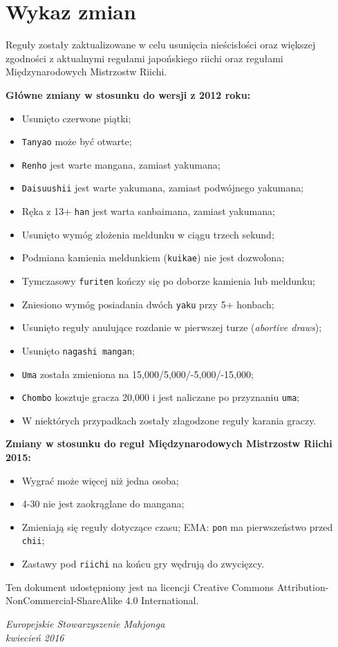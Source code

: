 \section*{Wykaz zmian}

Reguły zostały zaktualizowane w celu usunięcia nieścisłości oraz większej zgodności z aktualnymi regułami japońskiego riichi oraz regułami Międzynarodowych Mistrzostw Riichi.

\textbf{Główne zmiany w stosunku do wersji z 2012 roku:}
\begin{itemize}
    \item Usunięto czerwone piątki;
    \item \texttt{Tanyao} może być otwarte;
    \item \texttt{Renho} jest warte mangana, zamiast yakumana;
    \item \texttt{Daisuushii} jest warte yakumana, zamiast podwójnego yakumana;
    \item Ręka z 13+ \texttt{han} jest warta sanbaimana, zamiast yakumana;
    \item Usunięto wymóg złożenia meldunku w ciągu trzech sekund;
    \item Podmiana kamienia meldunkiem (\texttt{kuikae}) nie jest dozwolona;
    \item Tymczasowy \texttt{furiten} kończy się po doborze kamienia lub meldunku;
    \item Zniesiono wymóg posiadania dwóch \texttt{yaku} przy 5+ honbach;
    \item Usunięto reguły anulujące rozdanie w pierwszej turze (\emph{abortive draws});
    \item Usunięto \texttt{nagashi mangan};
    \item \texttt{Uma} została zmieniona na 15,000/5,000/-5,000/-15,000;
    \item \texttt{Chombo} kosztuje gracza 20,000 i jest naliczane po przyznaniu \texttt{uma};
    \item W niektórych przypadkach zostały złagodzone reguły karania graczy.
\end{itemize}

\textbf{Zmiany w stosunku do reguł Międzynarodowych Mistrzostw Riichi 2015:}
\begin{itemize}
    \item Wygrać może więcej niż jedna osoba;
    \item 4-30 nie jest zaokrąglane do mangana;
    \item Zmieniają się reguły dotyczące czasu; EMA: \texttt{pon} ma pierwszeństwo przed \texttt{chii};
    \item Zastawy pod \texttt{riichi} na końcu gry wędrują do zwycięzcy.
\end{itemize}

Ten dokument udostępniony jest na licencji Creative Commons Attribution-NonCommercial-ShareAlike 4.0 International.

\begin{flushright}
  \emph{
    Europejskie Stowarzyszenie Mahjonga \\
    kwiecień 2016
  }
\end{flushright}